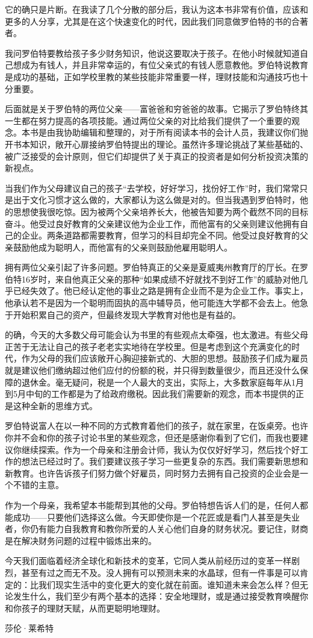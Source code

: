 它的确只是片断。在我读了几个分散的部分后，我认为这本书非常有价值，应该和更多的人分享，尤其是在这个快速变化的时代，因此我们同意做罗伯特的书的合著者。

我问罗伯特要教给孩子多少财务知识，他说这要取决于孩子。在他小时候就知道自己想成为有钱人，并且非常幸运的，有位父亲式的有钱人愿意教他。罗伯特说教育是成功的基础，正如学校里教的某些技能非常重要一样，理财技能和沟通技巧也十分重要。

后面就是关于罗伯特的两位父亲——富爸爸和穷爸爸的故事。它揭示了罗伯特终其一生都在努力提高的各项技能。通过两位父亲的对比给我们提供了一个重要的观念。本书是由我协助编辑和整理的，对于所有阅读本书的会计人员，我建议你们抛开书本知识，敞开心扉接纳罗伯特提出的理论。虽然许多理论挑战了某些基础的、被广泛接受的会计原则，但它们却提供了关于真正的投资者是如何分析投资决策的新视点。

当我们作为父母建议自己的孩子“去学校，好好学习，找份好工作”时，我们常常只是出于文化习惯才这么做的，大家都认为这么做是对的。但当我遇到罗伯特时，他的思想使我很吃惊。因为被两个父亲培养长大，他被告知要为两个截然不同的目标奋斗。他受过良好教育的父亲建议他为企业工作，而他富有的父亲则建议他拥有自己的企业。两条道路都需要教育，但学习的科目却完全不同。他受过良好教育的父亲鼓励他成为聪明人，而他富有的父亲则鼓励他雇用聪明人。

拥有两位父亲引起了许多问题。罗伯特真正的父亲是夏威夷州教育厅的厅长。在罗伯特16岁时，来自他真正父亲的那种“如果成绩不好就找不到好工作”的威胁对他几乎已经失效了。他已经认定他的事业之路是拥有企业而不是为企业工作。事实上，他承认若不是因为一个聪明而固执的高中辅导员，他可能连大学都不会去上。他急于开始积累自己的资产，但最终发现大学教育对他也是有益的。

的确，今天的大多数父母可能会认为书里的有些观点太牵强，也太激进。有些父母正苦于无法让自己的孩子老老实实地待在学校里。但是考虑到这个充满变化的时代，作为父母的我们应该敞开心胸迎接新式的、大胆的思想。鼓励孩子们成为雇员就是建议他们缴纳超过他们应付的份额的税，并只得到数量很少，而且还没什么保障的退休金。毫无疑问，税是一个人最大的支出，实际上，大多数家庭每年从1月到5月中旬的工作都是为了给政府缴税。因此我们需要新的观念，而本书提供的正是这种全新的思维方式。

罗伯特说富人在以一种不同的方式教育着他们的孩子，就在家里，在饭桌旁。也许你并不会和你的孩子讨论书里的某些观念，但还是感谢你看到了它们，而我也要建议你继续探索。作为一个母亲和注册会计师，我认为仅仅好好学习，然后找个好工作的想法已经过时了。我们要建议孩子学习一些更复杂的东西。我们需要新思想和新教育。也许告诉孩子们努力做个好雇员，同时努力去拥有自己投资的企业会是一个不错的主意。

作为一个母亲，我希望本书能帮到其他的父母。罗伯特想告诉人们的是，任何人都能成功——只要他们选择这么做。今天即使你是一个花匠或是看门人甚至是失业者，你仍有能力自我教育和教你所爱的人关心他们自身的财务状况。要记住，财商是在解决财务问题的过程中锻炼出来的。

今天我们面临着经济全球化和新技术的变革，它同人类从前经历过的变革一样剧烈，甚至有过之而无不及。没人拥有可以预测未来的水晶球，但有一件事是可以肯定的：比我们现实生活中的变化更大的变化就在前面。谁知道未来会怎么样？但无论发生什么，我们至少有两个基本的选择：安全地理财，或是通过接受教育唤醒你和你孩子的理财天赋，从而更聪明地理财。

\hfill 莎伦·莱希特
